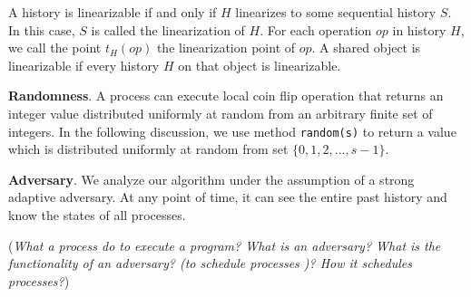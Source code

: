 A history is linearizable if and only if $H$ linearizes to some sequential history $S$. In this case,
$S$ is called the linearization of $H$. For each operation $op$ in history $H$, we call the point $t_H(op)$
the linearization point of $op$. A shared object is linearizable if every history $H$ on that object is linearizable.



\textbf{Randomness}.
A process can execute local coin flip operation that returns an integer value distributed
uniformly at random from an arbitrary finite set of integers. In the following discussion, we use method
\texttt{random(s)} to return a value which is distributed uniformly at random from set $\{0, 1, 2,..., s-1\}$.



\textbf{Adversary}.
We analyze our algorithm under the assumption of a strong adaptive adversary. At any
point of time, it can see the entire past history and know the states of all processes.

(\emph{What a process do to execute a program? What is an adversary? What is the functionality of an adversary? (to schedule processes )?
How it schedules processes?})


